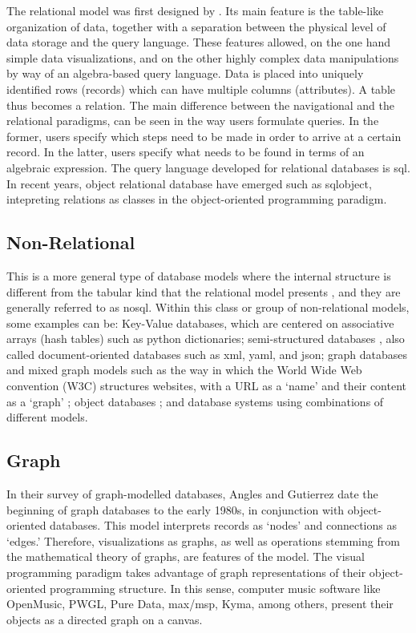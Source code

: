 The relational model was first designed by \textcites{Codd:1970:RMD:362384.362685}{Codd72relationalcompleteness}. Its main feature is the table-like organization of data, together with a separation between the physical level of data storage and the query language. These features allowed, on the one hand simple data visualizations, and on the other highly complex data manipulations by way of an algebra-based query language. Data is placed into uniquely identified rows (records) which can have multiple columns (attributes). A table thus becomes a relation. The main difference between the navigational and the relational paradigms, can be seen in the way users formulate queries. In the former, users specify which steps need to be made in order to arrive at a certain record. In the latter, users specify what needs to be found in terms of an algebraic expression. The query language developed for relational databases is \gls{sql}. In recent years, object relational database have emerged such as \gls{sqlobject}, intepreting relations as classes in the object-oriented programming paradigm.

\subsection{Non-Relational}
\label{model:nonrelational}

This is a more general type of database models where the internal structure is different from the tabular kind that the relational model presents , and they are generally referred to as \gls{nosql}. Within this class or group of non-relational models, some examples can be: Key-Value databases, which are centered on associative arrays (hash tables) such as python dictionaries; semi-structured databases , also called document-oriented databases such as \gls{xml}, \gls{yaml}, and \gls{json}; graph databases and mixed graph models such as the way in which the World Wide Web convention (W3C) structures websites, with a URL as a `name' and their content as a `graph' ; object databases ; and database systems using combinations of different models.

\subsection{Graph}
\label{model:graph}

In their survey of graph-modelled databases, Angles and Gutierrez \parencite{2008:graph/anglesgutierrez/survey} date the beginning of graph databases to the early 1980s, in conjunction with object-oriented databases. This model interprets records as `nodes' and connections as `edges.' Therefore, visualizations as graphs, as well as operations stemming from the mathematical theory of graphs, are features of the model. The visual programming paradigm takes advantage of graph representations of their object-oriented programming structure. In this sense, computer music software like OpenMusic, PWGL, Pure Data, \gls{max/msp}, Kyma, among others, present their objects as a directed graph on a canvas.

